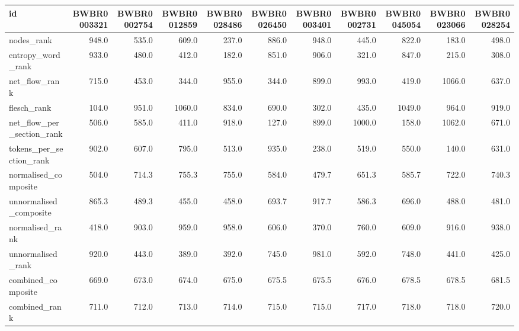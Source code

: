 \begin{tabular}{lrrrrrrrrrr}
\toprule
id & BWBR0003321 & BWBR0002754 & BWBR0012859 & BWBR0028486 & BWBR0026450 & BWBR0003401 & BWBR0002731 & BWBR0045054 & BWBR0023066 & BWBR0028254 \\
\midrule
nodes\_rank & 948.0 & 535.0 & 609.0 & 237.0 & 886.0 & 948.0 & 445.0 & 822.0 & 183.0 & 498.0 \\
\cline{1-11}
entropy\_word\_rank & 933.0 & 480.0 & 412.0 & 182.0 & 851.0 & 906.0 & 321.0 & 847.0 & 215.0 & 308.0 \\
\cline{1-11}
net\_flow\_rank & 715.0 & 453.0 & 344.0 & 955.0 & 344.0 & 899.0 & 993.0 & 419.0 & 1066.0 & 637.0 \\
\cline{1-11}
flesch\_rank & 104.0 & 951.0 & 1060.0 & 834.0 & 690.0 & 302.0 & 435.0 & 1049.0 & 964.0 & 919.0 \\
\cline{1-11}
net\_flow\_per\_section\_rank & 506.0 & 585.0 & 411.0 & 918.0 & 127.0 & 899.0 & 1000.0 & 158.0 & 1062.0 & 671.0 \\
\cline{1-11}
tokens\_per\_section\_rank & 902.0 & 607.0 & 795.0 & 513.0 & 935.0 & 238.0 & 519.0 & 550.0 & 140.0 & 631.0 \\
\cline{1-11}
normalised\_composite & 504.0 & 714.3 & 755.3 & 755.0 & 584.0 & 479.7 & 651.3 & 585.7 & 722.0 & 740.3 \\
\cline{1-11}
unnormalised\_composite & 865.3 & 489.3 & 455.0 & 458.0 & 693.7 & 917.7 & 586.3 & 696.0 & 488.0 & 481.0 \\
\cline{1-11}
normalised\_rank & 418.0 & 903.0 & 959.0 & 958.0 & 606.0 & 370.0 & 760.0 & 609.0 & 916.0 & 938.0 \\
\cline{1-11}
unnormalised\_rank & 920.0 & 443.0 & 389.0 & 392.0 & 745.0 & 981.0 & 592.0 & 748.0 & 441.0 & 425.0 \\
\cline{1-11}
combined\_composite & 669.0 & 673.0 & 674.0 & 675.0 & 675.5 & 675.5 & 676.0 & 678.5 & 678.5 & 681.5 \\
\cline{1-11}
combined\_rank & 711.0 & 712.0 & 713.0 & 714.0 & 715.0 & 715.0 & 717.0 & 718.0 & 718.0 & 720.0 \\
\cline{1-11}
\bottomrule
\end{tabular}
